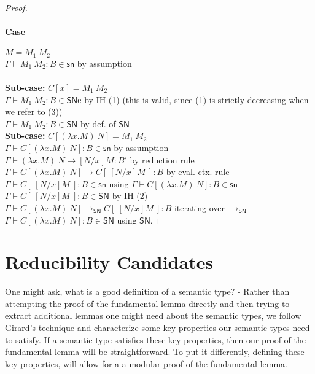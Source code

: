 \documentclass{article}
\newcommand{\SN}{\mathsf{SN}}
\newcommand{\SNe}{\mathsf{SNe}}
\newcommand{\csn}{\mathsf{sn}}
\newcommand{\red}{\longrightarrow}
\newcommand{\redSN}{\longrightarrow_\SN}
\begin{document}
\begin{proof}
\paragraph{Case} $M = M_1~M_2$
\\[1em]
$\Gamma \vdash M_1~M_2 : B \in \csn$ \hfill by assumption\\
\\[0.5em]
 \textbf{Sub-case:} $C[x] = M_1~M_2$ \\[0.5em]
 $\Gamma \vdash M_1~M_2 : B \in \SNe$ \hfill by IH (1) (this is valid,
 since (1) is strictly decreasing when we refer to (3))\\
 $\Gamma \vdash M_1~M_2 : B \in \SN$ \hfill by def. of $\SN$
 \\[1em]
 \textbf{Sub-case:} $C[(\lambda x.M)~N] = M_1~M_2$ \\[0.5em]
$\Gamma \vdash C[(\lambda x.M)~N] : B \in \csn$ \hfill by assumption \\
$\Gamma \vdash (\lambda x.M)~N \red [N/x]M : B'$ \hfill by reduction rule \\
$\Gamma \vdash C[(\lambda x.M)~N] \red C[~[N/x]M~] : B$ \hfill by eval. ctx. rule\\
$\Gamma \vdash C[~[N/x]M~] : B \in \csn$ \hfill using $\Gamma \vdash C[(\lambda x.M)~N] : B \in \csn$ \\
$\Gamma \vdash  C[~[N/x]M~] : B \in \SN$ \hfill by IH (2)\\
$\Gamma \vdash C[(\lambda x.M)~N] \redSN  C[~[N/x]M~] : B$ \hfill iterating over $\redSN$\\
$\Gamma \vdash C[(\lambda x.M)~N] : B \in \SN$ \hfill using $\SN$.

\end{proof}


\section{Reducibility Candidates}
One might ask, what is a good definition of a semantic type? - Rather than
attempting the proof of the fundamental lemma directly and then trying to
extract additional lemmas one might need about the semantic types, we follow
Girard's technique and characterize some key properties our semantic types need
to satisfy. If a semantic type satisfies these key properties, then our proof of the fundamental lemma will be straightforward. To put it differently, defining these key properties, will allow for a  a modular proof of the fundamental lemma.
\end{document}
